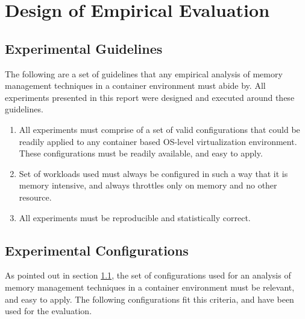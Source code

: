 
\chapter{Design of Empirical Evaluation}

  \section{Experimental Guidelines}
    \label{section_guidelines}
    
    The following are a set of guidelines that any empirical analysis of memory management techniques in a container environment must 
abide by.  All experiments presented in this report were designed and executed around these guidelines.

    \begin{enumerate}
      \item All experiments must comprise of a set of valid configurations that could be readily applied to any container based OS-level 
virtualization environment. These configurations must be readily available, and easy to apply.
      \item Set of workloads used must always be configured in such a way that it is memory intensive, and always throttles only on memory 
and no other resource.
      \item All experiments must be reproducible and statistically correct.      
    \end{enumerate}

  \section{Experimental Configurations}
    
    As pointed out in section \ref{section_guidelines}, the set of configurations used for an analysis of memory management techniques in a 
container environment must be relevant, and easy to apply. The following configurations fit this criteria, and have been used for the 
evaluation.
    
